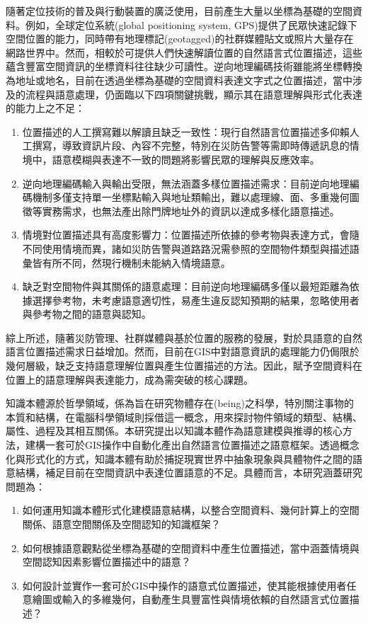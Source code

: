 隨著定位技術的普及與行動裝置的廣泛使用，目前產生大量以坐標為基礎的空間資料。例如，全球定位系統(global positioning system, GPS)提供了民眾快速記錄下空間位置的能力，同時帶有地理標記(geotagged)的社群媒體貼文或照片大量存在網路世界中。然而，相較於可提供人們快速解讀位置的自然語言式位置描述，這些蘊含豐富空間資訊的坐標資料往往缺少可讀性。逆向地理編碼技術雖能將坐標轉換為地址或地名，目前在透過坐標為基礎的空間資料表達文字式之位置描述，當中涉及的流程與語意處理，仍面臨以下四項關鍵挑戰，顯示其在語意理解與形式化表達的能力上之不足：

\begin{enumerate}
\item 位置描述的人工撰寫難以解讀且缺乏一致性：現行自然語言位置描述多仰賴人工撰寫，導致資訊片段、內容不完整，特別在災防告警等需即時傳遞訊息的情境中，語意模糊與表達不一致的問題將影響民眾的理解與反應效率。
    \item 逆向地理編碼輸入與輸出受限，無法涵蓋多樣位置描述需求：目前逆向地理編碼機制多僅支持單一坐標點輸入與地址類輸出，難以處理線、面、多重幾何圖徵等實務需求，也無法產出除門牌地址外的資訊以達成多樣化語意描述。
    \item 情境對位置描述具有高度影響力：位置描述所依據的參考物與表達方式，會隨不同使用情境而異，諸如災防告警與道路路況需參照的空間物件類型與描述語彙皆有所不同，然現行機制未能納入情境語意。
    \item 缺乏對空間物件與其關係的語意處理：目前逆向地理編碼多僅以最短距離為依據選擇參考物，未考慮語意適切性，易產生違反認知預期的結果，忽略使用者與參考物之間的語意與認知。
\end{enumerate}

綜上所述，隨著災防管理、社群媒體與基於位置的服務的發展，對於具語意的自然語言位置描述需求日益增加。然而，目前在GIS中對語意資訊的處理能力仍侷限於幾何層級，缺乏支持語意理解位置與產生位置描述的方法。因此，賦予空間資料在位置上的語意理解與表達能力，成為需突破的核心課題。

知識本體源於哲學領域，係為旨在研究物體存在(being)之科學，特別關注事物的本質和結構，在電腦科學領域則採借這一概念，用來探討物件領域的類型、結構、屬性、過程及其相互關係\citep{RN160, RN92}。本研究提出以知識本體作為語意建模與推導的核心方法，建構一套可於GIS操作中自動化產出自然語言位置描述之語意框架。透過概念化與形式化的方式，知識本體有助於捕捉現實世界中抽象現象與具體物件之間的語意結構，補足目前在空間資訊中表達位置語意的不足。具體而言，本研究涵蓋研究問題為：

\begin{enumerate}
    \item 如何運用知識本體形式化建模語意結構，以整合空間資料、幾何計算上的空間關係、語意空間關係及空間認知的知識框架？
    \item 如何根據語意觀點從坐標為基礎的空間資料中產生位置描述，當中涵蓋情境與空間認知因素影響位置描述中的語意？
    \item 如何設計並實作一套可於GIS中操作的語意式位置描述，使其能根據使用者任意繪圖或輸入的多維幾何，自動產生具豐富性與情境依賴的自然語言式位置描述？
\end{enumerate}


